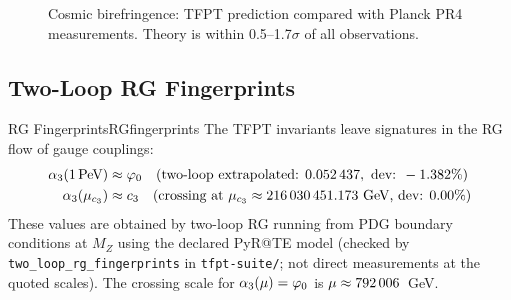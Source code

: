 \begin{figure}[H]
\centering
{}
\caption{Cosmic birefringence: TFPT prediction compared with Planck PR4 
measurements. Theory is within 0.5--1.7$\sigma$ of all observations.}
\label{fig:birefringence}
\end{figure}

\subsection{Two-Loop RG Fingerprints}

\begin{corollary}{RG Fingerprints}{RGfingerprints}
The TFPT invariants leave signatures in the RG flow of gauge couplings:
\begin{align}
    \alpha_3(1\,\text{PeV}) &\approx \phiz \quad 
        \text{(two-loop extrapolated: } \num[round-mode=places,round-precision=6]{\TFPTalphaThreePeVNum}, \text{ dev: } -\num[round-mode=places,round-precision=3]{\TFPTalphaThreePeVRelDevPercent}\%\text{)}\\
    \alpha_3(\mu_{\cthree}) &\approx \cthree \quad 
        \text{(crossing at } \mu_{\cthree}\approx \num[round-mode=places,round-precision=3]{\TFPTmuCrosscThreeGeV}\ \text{GeV, dev: } 0.00\%\text{)}
\end{align}
These values are obtained by two-loop RG running from PDG boundary conditions at $M_Z$ using the declared PyR@TE model (checked by \texttt{two\_loop\_rg\_fingerprints} in \texttt{tfpt-suite/}; not direct measurements at the quoted scales). The crossing scale for $\alpha_3(\mu)=\phiz$ is $\mu\approx \num[round-mode=places,round-precision=0]{\TFPTmuCrossVarphiZeroGeV}$~GeV.
\end{corollary}

